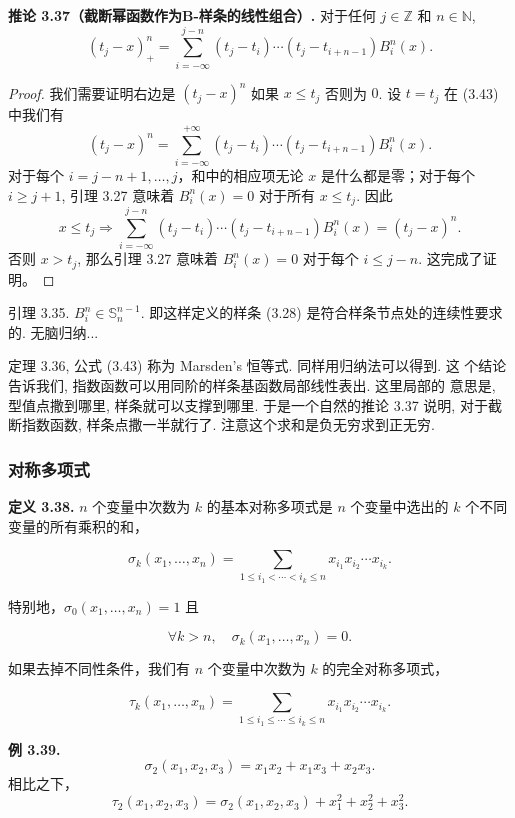 \documentclass[a4paper]{ctexart}
\begin{document}
{\noindent \textbf{推论 3.37（截断幂函数作为B-样条的线性组合）.} 对于任何 $j \in \mathbb{Z}$ 和 $n \in \mathbb{N}$,
\[
(t_j - x)_+^n = \sum_{i=-\infty}^{j-n} (t_j - t_i) \cdots (t_j - t_{i+n-1}) B_i^n(x). \tag{3.45}
\]

\begin{proof}
我们需要证明右边是 $(t_j - x)^n$ 如果 $x \leq t_j$ 否则为 $0$. 设 $t=t_j$ 在 (3.43) 中我们有
\[
  (t_j - x)^n = \sum_{i=-\infty}^{+\infty} (t_j - t_i) \cdots (t_j - t_{i+n-1}) B_i^n(x).
\]
对于每个 $i = j - n + 1, \ldots, j$，和中的相应项无论 $x$ 是什么都是零；对于每个 $i \geq j + 1$, 引理 3.27 意味着 $B_i^n(x) = 0$ 对于所有 $x \leq t_j$. 
因此
\[
  x \leq t_j \Longrightarrow \sum_{i=-\infty}^{j-n} (t_j - t_i) \cdots (t_j - t_{i+n-1}) B_i^n(x) = (t_j - x)^n.
\]
否则 $x > t_j$, 那么引理 3.27 意味着 $B_i^n(x) = 0$ 对于每个 $i \leq j - n$. 这完成了证明。
\end{proof}

引理 3.35. $B_i^n \in \mathbb{S}_n^{n - 1}$. 即这样定义的样条 (3.28)
是符合样条节点处的连续性要求的. 无脑归纳...

定理 3.36, 公式 (3.43) 称为 Marsden's 恒等式. 同样用归纳法可以得到. 这
个结论告诉我们, 指数函数可以用同阶的样条基函数局部线性表出. 这里局部的
意思是, 型值点撒到哪里, 样条就可以支撑到哪里. 于是一个自然的推论 3.37
说明, 对于截断指数函数, 样条点撒一半就行了. 注意这个求和是负无穷求到正无穷.

\subsubsection{对称多项式}


\noindent \textbf{定义 3.38.} $n$ 个变量中次数为 $k$ 的基本对称多项式是 $n$ 
个变量中选出的 $k$ 个不同变量的所有乘积的和，

\[
\sigma_k(x_1, \ldots, x_n) 
= \sum_{1 \leq i_1 < \cdots < i_k \leq n} 
x_{i_1} x_{i_2} \cdots x_{i_k}. \tag{3.46}
\]

特别地，$\sigma_0(x_1, \ldots, x_n) = 1$ 且

\[
\forall k > n, \quad \sigma_k(x_1, \ldots, x_n) = 0.
\]

如果去掉不同性条件，我们有 $n$ 个变量中次数为 $k$ 的完全对称多项式，

\[
\tau_k(x_1, \ldots, x_n) 
= \sum_{1 \leq i_1 \leq \cdots \leq i_k \leq n} x_{i_1} x_{i_2} \cdots x_{i_k}. 
\tag{3.47}
\]

\noindent \textbf{例 3.39.} 
$$
\sigma_2(x_1, x_2, x_3) = x_1 x_2 + x_1 x_3 + x_2 x_3.
$$ 
相比之下，
$$
\tau_2(x_1, x_2, x_3) = \sigma_2(x_1, x_2, x_3) + x_1^2 + x_2^2 + x_3^2.
$$

}
\end{document}
